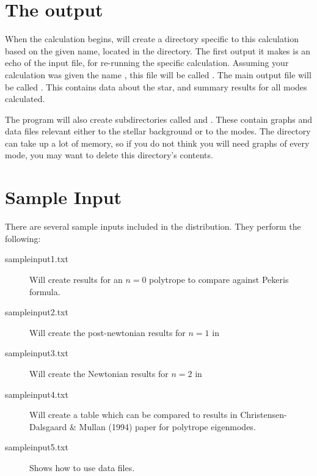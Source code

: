 \section{The output}
When the calculation begins,  will create a directory specific to this calculation based on the given name, located in the  directory.  The first output it makes is an echo of the input file, for re-running the specific calculation.  Assuming your calculation was given the name , this file will be called .  The main output file will be called .  This contains data about the star, and summary results for all modes calculated.

The program will also create subdirectories called  and .  These contain graphs and data files relevant either to the stellar background or to the modes.  The  directory can take up a lot of memory, so if you do not think you will need graphs of every mode, you may want to delete this directory's contents.

\section{Sample Input}
There are several sample inputs included in the distribution.  They perform the following:
\begin{description}
	\item[sampleinput1.txt] Will create results for an $n=0$ polytrope to compare against Pekeris formula.
	\item[sampleinput2.txt] Will create the post-newtonian results for $n=1$ in \mypaper
	\item[sampleinput3.txt] Will create the Newtonian results for $n=2$ in \mypaper
	\item[sampleinput4.txt] Will create a table which can be compared to results in Christensen-Dalsgaard \& Mullan (1994) paper for polytrope eigenmodes.
	\item[sampleinput5.txt] Shows how to use  data files.
\end{description}
